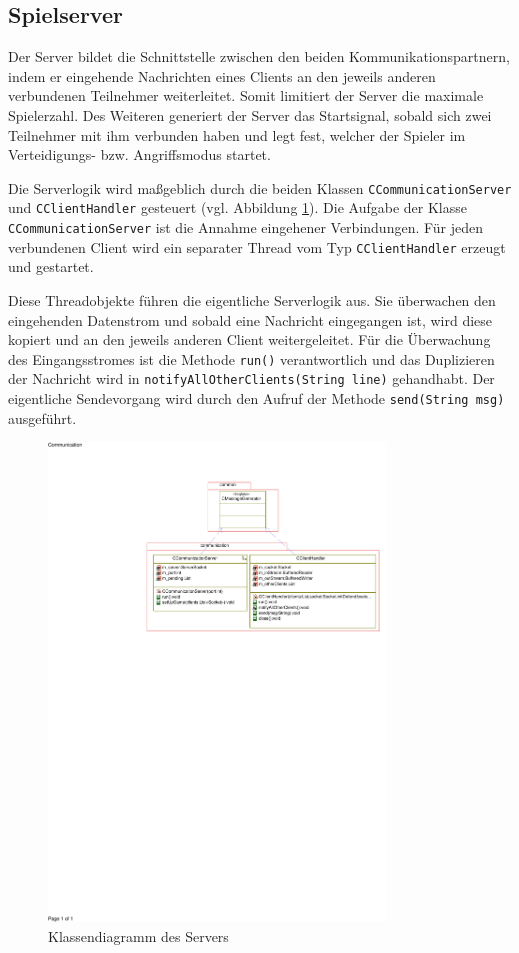\subsection{Spielserver}
\label{sec:Spielserver}

Der Server bildet die Schnittstelle zwischen den beiden Kommunikationspartnern, indem er eingehende Nachrichten eines Clients an den jeweils anderen verbundenen Teilnehmer weiterleitet.
Somit limitiert der Server die maximale Spielerzahl. Des Weiteren generiert der Server das Startsignal, sobald sich zwei Teilnehmer mit ihm verbunden haben
und legt fest, welcher der Spieler im Verteidigungs- bzw. Angriffsmodus startet.

Die Serverlogik wird maßgeblich durch die beiden Klassen \texttt{CCom\-mu\-ni\-ca\-tion\-Ser\-ver} und \texttt{CCli\-ent\-Han\-dler} gesteuert (vgl. Abbildung \ref{fig:Serverklassendiagramm}).
Die Aufgabe der Klasse \texttt{CCom\-mu\-ni\-ca\-tion\-Ser\-ver} ist die Annahme eingehener Verbindungen.
Für jeden verbundenen Client wird ein separater Thread vom Typ \texttt{CCli\-ent\-Han\-dler} erzeugt und gestartet.

Diese Threadobjekte führen die eigentliche Serverlogik aus.
Sie überwachen den eingehenden Datenstrom und sobald eine Nachricht eingegangen ist, wird diese kopiert und an den jeweils anderen Client weitergeleitet.
Für die Überwachung des Eingangsstromes ist die Methode \texttt{run()} verantwortlich und das Duplizieren der Nachricht wird in \texttt{notify\-All\-Other\-Cli\-ents(String line)} gehandhabt.
Der eigentliche Sendevorgang wird durch den Aufruf der Methode \texttt{send(String msg)} ausgeführt.

\begin{figure}[H]
  \centering
  \includegraphics[trim=60mm 170mm 0mm 20mm,clip,width=0.8\textwidth]{images/Server.pdf}
  \caption{Klassendiagramm des Servers}
  \label{fig:Serverklassendiagramm}
\end{figure}
